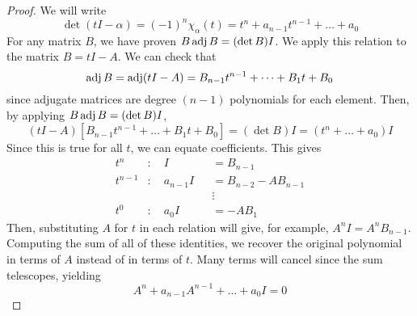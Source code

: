 \begin{proof}
	We will write
	\[
		\det(t I - \alpha) = (-1)^n \chi_\alpha(t) = t^n + a_{n-1}t^{n-1} + \dots + a_0
	\]
	For any matrix \( B \), we have proven \( B \operatorname{adj} B = (\det B) I \).
	We apply this relation to the matrix \( B = tI - A \).
	We can check that
	\[
		\operatorname{adj} B = \operatorname{adj}(tI - A) = B_{n-1} t^{n-1} + \dots + B_1 t + B_0
	\]
	since adjugate matrices are degree \( (n-1) \) polynomials for each element.
	Then, by applying \( B \operatorname{adj} B = (\det B) I \),
	\[
		(tI - A) [ B_{n-1} t^{n-1} + \dots + B_1 t + B_0 ] = (\det B) I = (t^n + \dots + a_0) I
	\]
	Since this is true for all \( t \), we can equate coefficients.
	This gives
	\begin{align*}
		t^n     & : \quad I         &  & = B_{n-1}           \\
		t^{n-1} & : \quad a_{n-1} I &  & =B_{n-2} - AB_{n-1} \\
		        &                   &  & \vdots              \\
		t^0     & : \quad a_0 I     &  & = -A B_1
	\end{align*}
	Then, substituting \( A \) for \( t \) in each relation will give, for example, \( A^n I = A^n B_{n-1} \).
	Computing the sum of all of these identities, we recover the original polynomial in terms of \( A \) instead of in terms of \( t \).
	Many terms will cancel since the sum telescopes, yielding
	\[
		A^n + a_{n-1} A^{n-1} + \dots + a_0 I = 0
	\]
\end{proof}


